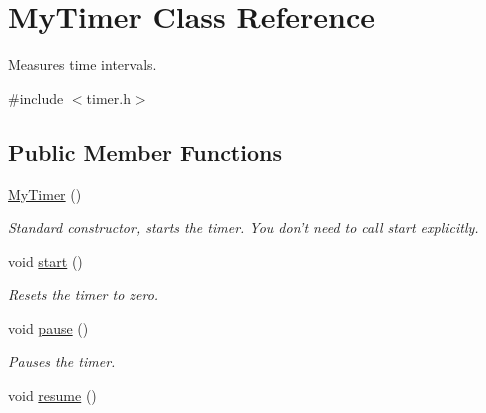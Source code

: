 \hypertarget{classMyTimer}{
\section{\-My\-Timer \-Class \-Reference}
\label{d0/df5/classMyTimer}
}


\-Measures time intervals.  




{\ttfamily \#include $<$timer.\-h$>$}

\subsection*{\-Public \-Member \-Functions}
\begin{DoxyCompactItemize}
\item 
\hypertarget{classMyTimer_a75440365bcfd96d34be38d8a0c9c014b}{
\hyperlink{classMyTimer_a75440365bcfd96d34be38d8a0c9c014b}{\-My\-Timer} ()}
\label{d0/df5/classMyTimer_a75440365bcfd96d34be38d8a0c9c014b}

\begin{DoxyCompactList}\small\item\em \-Standard constructor, starts the timer. \-You don't need to call start explicitly. \end{DoxyCompactList}\item 
\hypertarget{classMyTimer_a34d3d8fa5340709ffa65c6da8f641b80}{
void \hyperlink{classMyTimer_a34d3d8fa5340709ffa65c6da8f641b80}{start} ()}
\label{d0/df5/classMyTimer_a34d3d8fa5340709ffa65c6da8f641b80}

\begin{DoxyCompactList}\small\item\em \-Resets the timer to zero. \end{DoxyCompactList}\item 
\hypertarget{classMyTimer_a31f7879ce9e912151bb6d55538964005}{
void \hyperlink{classMyTimer_a31f7879ce9e912151bb6d55538964005}{pause} ()}
\label{d0/df5/classMyTimer_a31f7879ce9e912151bb6d55538964005}

\begin{DoxyCompactList}\small\item\em \-Pauses the timer. \end{DoxyCompactList}\item 
\hypertarget{classMyTimer_a3dfc5de2fd5cd294f2b46fd7be41757b}{
void \hyperlink{classMyTimer_a3dfc5de2fd5cd294f2b46fd7be41757b}{resume} ()}
\label{d0/df5/classMyTimer_a3dfc5de2fd5cd294f2b46fd7be41757b}


\end{DoxyCompactItemize}
